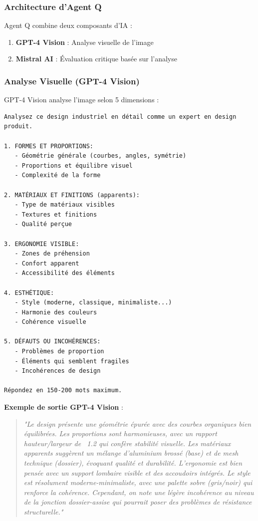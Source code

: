 \subsubsection{Architecture d'Agent Q}

Agent Q combine deux composants d'IA :

\begin{enumerate}[leftmargin=*]
    \item \textbf{GPT-4 Vision} : Analyse visuelle de l'image
    \item \textbf{Mistral AI} : Évaluation critique basée sur l'analyse
\end{enumerate}

\subsubsection{Analyse Visuelle (GPT-4 Vision)}

GPT-4 Vision analyse l'image selon 5 dimensions :

\begin{lstlisting}[caption=Prompt d'analyse visuelle]
Analysez ce design industriel en détail comme un expert en design produit.

1. FORMES ET PROPORTIONS:
   - Géométrie générale (courbes, angles, symétrie)
   - Proportions et équilibre visuel
   - Complexité de la forme

2. MATÉRIAUX ET FINITIONS (apparents):
   - Type de matériaux visibles
   - Textures et finitions
   - Qualité perçue

3. ERGONOMIE VISIBLE:
   - Zones de préhension
   - Confort apparent
   - Accessibilité des éléments

4. ESTHÉTIQUE:
   - Style (moderne, classique, minimaliste...)
   - Harmonie des couleurs
   - Cohérence visuelle

5. DÉFAUTS OU INCOHÉRENCES:
   - Problèmes de proportion
   - Éléments qui semblent fragiles
   - Incohérences de design

Répondez en 150-200 mots maximum.
\end{lstlisting}

\textbf{Exemple de sortie GPT-4 Vision} :

\begin{quote}
\textit{"Le design présente une géométrie épurée avec des courbes organiques bien équilibrées. Les proportions sont harmonieuses, avec un rapport hauteur/largeur de ~1.2 qui confère stabilité visuelle. Les matériaux apparents suggèrent un mélange d'aluminium brossé (base) et de mesh technique (dossier), évoquant qualité et durabilité. L'ergonomie est bien pensée avec un support lombaire visible et des accoudoirs intégrés. Le style est résolument moderne-minimaliste, avec une palette sobre (gris/noir) qui renforce la cohérence. Cependant, on note une légère incohérence au niveau de la jonction dossier-assise qui pourrait poser des problèmes de résistance structurelle."}
\end{quote}


